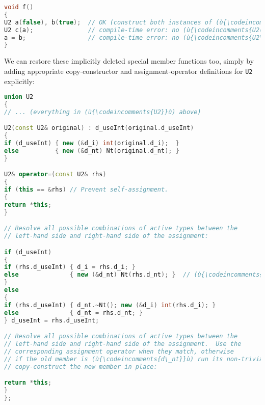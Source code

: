 \begin{lstlisting}[language=C++]
void f()
{
U2 a(false), b(true);  // OK (construct both instances of (ù{\codeincomments{U2}}ù))
U2 c(a);               // compile-time error: no (ù{\codeincomments{U2(const U2\&)}}ù)
a = b;                 // compile-time error: no (ù{\codeincomments{U2\& operator=(const U2\&)}}ù)
}
\end{lstlisting}

\noindent We can restore these implicitly deleted special member functions too,
simply by adding appropriate copy-constructor and assignment-operator
definitions for \lstinline!U2! explicitly:

%
%
%
%
%
\begin{lstlisting}[language=C++]
union U2
{
// ... (everything in (ù{\codeincomments{U2}}ù) above)

U2(const U2& original) : d_useInt(original.d_useInt)
{
if (d_useInt) { new (&d_i) int(original.d_i);  }
else          { new (&d_nt) Nt(original.d_nt); }
}

U2& operator=(const U2& rhs)
{
if (this == &rhs) // Prevent self-assignment.
{
return *this;
}

// Resolve all possible combinations of active types between the
// left-hand side and right-hand side of the assignment:

if (d_useInt)
{
if (rhs.d_useInt) { d_i = rhs.d_i; }
else              { new (&d_nt) Nt(rhs.d_nt); }  // (ù{\codeincomments{int}}ù) DTOR trivial
}
else
{
if (rhs.d_useInt) { d_nt.~Nt(); new (&d_i) int(rhs.d_i); }
else              { d_nt = rhs.d_nt; }
} d_useInt = rhs.d_useInt;

// Resolve all possible combinations of active types between the
// left-hand side and right-hand side of the assignment.  Use the
// corresponding assignment operator when they match, otherwise
// if the old member is (ù{\codeincomments{d\_nt}}ù) run its non-trivial destructor, then
// copy-construct the new member in place:

return *this;
}
};
\end{lstlisting}

